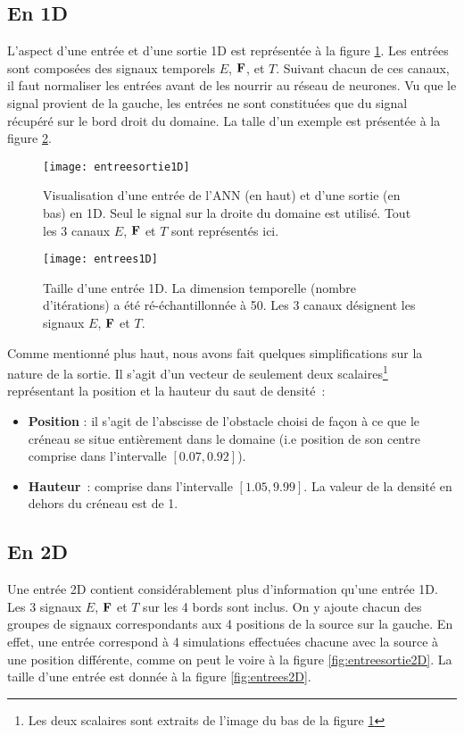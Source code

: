 \subsection{En 1D}
L'aspect d'une entrée et d'une sortie 1D est représentée à la figure \ref{fig:entreesortie1D}. Les entrées sont composées des signaux temporels $E$, $\mathbf{F}$, et $T$. Suivant chacun de ces canaux, il faut normaliser les entrées avant de les nourrir au réseau de neurones. Vu que le signal provient de la gauche, les entrées ne sont constituées que du signal récupéré sur le bord droit du domaine. La talle d'un exemple est présentée à la figure \ref{fig:entrees1D}. 

\begin{figure}[!h]
\centering
\texttt{[image: entreesortie1D]} 
\decoRule
\caption[entreesortie1D]{Visualisation d'une entrée de l'ANN (en haut) et d'une sortie (en bas) en 1D. Seul le signal sur la droite du domaine est utilisé. Tout les 3 canaux $E$, $\mathbf{F}$ et $T$ sont représentés ici.}
\label{fig:entreesortie1D}
\end{figure}

\begin{figure}[H]
\centering
\texttt{[image: entrees1D]} 
\decoRule
\caption[entrees1D]{Taille d'une entrée 1D. La dimension temporelle (nombre d'itérations) a été ré-échantillonnée à 50. Les 3 canaux désignent les signaux $E$, $\mathbf{F}$ et $T$.}
\label{fig:entrees1D}
\end{figure}

Comme mentionné plus haut, nous avons fait quelques simplifications sur la nature de la sortie. Il s'agit d'un vecteur de seulement deux scalaires\footnote{Les deux scalaires sont extraits de l'image du bas de la figure \ref{fig:entreesortie1D}} représentant la position et la hauteur du saut de densité :
\begin{itemize}
 \item \textbf{Position} : il s'agit de l'abscisse de l'obstacle choisi de façon à ce que le créneau se situe entièrement dans le domaine (i.e position de son centre comprise dans l'intervalle $[0.07,0.92]$).
 \item \textbf{Hauteur} : comprise dans l'intervalle $[1.05, 9.99]$. La valeur de la densité en dehors du créneau est de 1.
\end{itemize}


\subsection{En 2D}
Une entrée 2D contient considérablement plus d'information qu'une entrée 1D. Les 3 signaux $E$, $\mathbf{F}$ et $T$ sur les 4 bords sont inclus. On y ajoute chacun des groupes de signaux correspondants aux 4 positions de la source sur la gauche. En effet, une entrée correspond à 4 simulations effectuées chacune avec la source à une position différente, comme on peut le voire à la figure \ref{fig:entreesortie2D}. La taille d'une entrée est donnée à la figure \ref{fig:entrees2D}.

